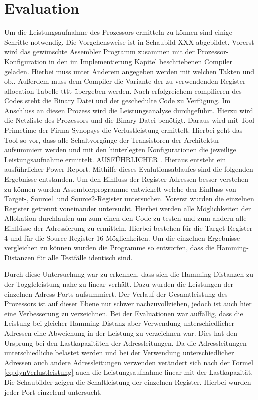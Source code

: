 \chapter{Evaluation}
\label{chap:evaluation}
Um die Leistungsaufnahme des Prozessors ermitteln zu können sind einige Schritte notwendig. Die Vorgehensweise ist in Schaubild XXX abgebildet. 
Vorerst wird das gewünschte Assembler Programm zusammen mit der Prozessor-Konfiguration in den im Implementierung Kapitel beschriebenen Compiler geladen. Hierbei muss unter Anderem angegeben werden mit welchen Takten und ob.. Außerdem muss dem Compiler die Variante der zu verwendenden Register allocation Tabelle tttt übergeben werden. Nach erfolgreichem compilieren des Codes steht die Binary Datei und der geschedulte Code zu Verfügung. Im Anschluss an diesen Prozess wird die Leistungsanalyse durchgeführt. Hierzu wird die Netzliste des Prozessors und die Binary Datei benötigt. Daraus wird mit Tool Primetime der Firma Synopsys die Verlustleistung ermittelt. Hierbei geht das Tool so vor, dass alle Schaltvorgänge der Transistoren der Architektur aufsummiert werden und mit den hinterlegten Konfigurationen die jeweilige Leistungsaufnahme ermittelt. AUSFÜHRLICHER . Hieraus entsteht ein ausführlicher Power Report. 
Mithilfe dieses Evalutionsablaufes sind die folgenden Ergebnisse entstanden.
Um den Einfluss der Register-Adressen besser verstehen zu können wurden Assemblerprogramme entwickelt welche den Einfluss von Target-, Source1 und Source2-Register untersuchen. Vorerst wurden die einzelnen Register getrennt voneinander untersucht. Hierbei werden alle Möglichkeiten der Allokation durchlaufen um zum einen den Code zu testen und zum andern alle Einflüsse der Adressierung zu ermitteln. Hierbei bestehen für die Target-Register 4 und für die Source-Register 16 Möglichkeiten. Um die einzelnen Ergebnisse vergleichen zu können wurden die Programme so entworfen, dass die Hamming-Distanzen für alle Testfälle identisch sind. 

Durch diese Untersuchung war zu erkennen, dass sich die Hamming-Distanzen zu der Toggleleistung nahe zu linear verhält. Dazu wurden die Leistungen der einzelnen Adress-Ports aufsummiert. Der Verlauf der Gesamtleistung des Prozessors ist auf dieser Ebene nur schwer nachzuvollziehen, jedoch ist auch hier eine Verbesserung zu verzeichnen. 
Bei der Evaluationen war auffällig, dass die Leistung bei gleicher Hamming-Distanz aber Verwendung unterschiedlicher Adressen eine Abweichung in der Leistung zu verzeichnen war. Dies hat den Ursprung bei den Lastkapazitäten der Adressleitungen. Da die Adressleitungen unterschiedliche belastet werden und bei der Verwendung unterschiedlicher Adressen auch andere Adressleitungen verwenden verändert sich nach der Formel \ref{eq:dynVerlustleistung} auch die Leistungsaufnahme linear mit der Lastkapazität. 
Die Schaubilder zeigen die Schaltleistung der einzelnen Register. Hierbei wurden jeder Port einzelend untersucht. 

